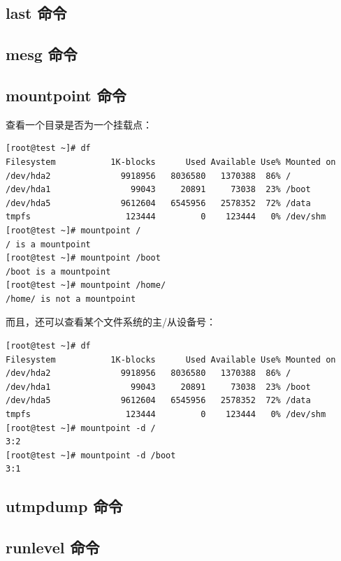\subsection{last 命令}

\subsection{mesg 命令}

\subsection{mountpoint 命令}

查看一个目录是否为一个挂载点：

{\begin{shaded}\begin{verbatim}
[root@test ~]# df 
Filesystem           1K-blocks      Used Available Use% Mounted on
/dev/hda2              9918956   8036580   1370388  86% /
/dev/hda1                99043     20891     73038  23% /boot
/dev/hda5              9612604   6545956   2578352  72% /data
tmpfs                   123444         0    123444   0% /dev/shm
[root@test ~]# mountpoint /
/ is a mountpoint
[root@test ~]# mountpoint /boot
/boot is a mountpoint
[root@test ~]# mountpoint /home/
/home/ is not a mountpoint
\end{verbatim}\end{shaded}}
而且，还可以查看某个文件系统的主/从设备号：

{\begin{shaded}\begin{verbatim}
[root@test ~]# df
Filesystem           1K-blocks      Used Available Use% Mounted on
/dev/hda2              9918956   8036580   1370388  86% /
/dev/hda1                99043     20891     73038  23% /boot
/dev/hda5              9612604   6545956   2578352  72% /data
tmpfs                   123444         0    123444   0% /dev/shm
[root@test ~]# mountpoint -d /
3:2
[root@test ~]# mountpoint -d /boot
3:1
\end{verbatim}\end{shaded}}
\subsection{utmpdump 命令}

\subsection{runlevel 命令}

